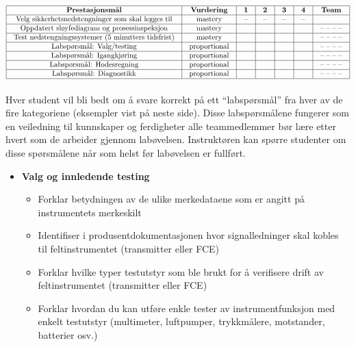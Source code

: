 $$\vbox{\offinterlineskip
\halign{\strut
\vrule \quad\hfil # \ \hfil & 
\vrule \quad\hfil # \ \hfil & 
\vrule \quad\hfil # \ \hfil & 
\vrule \quad\hfil # \ \hfil & 
\vrule \quad\hfil # \ \hfil & 
\vrule \quad\hfil # \ \hfil & 
\vrule \quad\hfil # \ \hfil \vrule \cr
\noalign{\hrule}
%
{\bf Prestasjonsmål} & {\bf Vurdering} & {\bf 1} & {\bf 2} & {\bf 3} & {\bf 4} & {\bf Team} \cr
%
\noalign{\hrule}
%
Velg sikkerhetsnedstengninger som skal legges til & mastery & -- & -- & -- & -- & \cr
%
\noalign{\hrule}
%
Oppdatert sløyfediagram og prosessinspeksjon & mastery & & & & & -- -- -- -- \cr
%
\noalign{\hrule}
%
Test nedstengningssystemer (5 minutters tidsfrist) & mastery & & & & & -- -- -- -- \cr
%
\noalign{\hrule}
%
Labspørsmål: Valg/testing & proportional &  &  &  &  & -- -- -- -- \cr
%
\noalign{\hrule}
%
Labspørsmål: Igangkjøring & proportional &  &  &  &  & -- -- -- -- \cr
%
\noalign{\hrule}
%
Labspørsmål: Hodesregning & proportional &  &  &  &  & -- -- -- -- \cr
%
\noalign{\hrule}
%
Labspørsmål: Diagnostikk & proportional &  &  &  &  & -- -- -- -- \cr
%
\noalign{\hrule}
} %
}$$ %

Hver student vil bli bedt om å svare korrekt på ett ``labspørsmål'' fra hver av de fire kategoriene (eksempler vist på neste side).  Disse labspørsmålene fungerer som en veiledning til kunnskaper og ferdigheter alle teammedlemmer bør lære etter hvert som de arbeider gjennom labøvelsen.  Instruktøren kan spørre studenter om disse spørsmålene når som helst før labøvelsen er fullført.

\vfil \eject

\noindent
{} 

\begin{itemize}
\item{} {\bf Valg og innledende testing}
\begin{itemize}

\item{} Forklar betydningen av de ulike merkedataene som er angitt på instrumentets merkeskilt
\item{} Identifiser i produsentdokumentasjonen hvor signalledninger skal kobles til feltinstrumentet (transmitter eller FCE)
\item{} Forklar hvilke typer testutstyr som ble brukt for å verifisere drift av feltinstrumentet (transmitter eller FCE)
\item{} Forklar hvordan du kan utføre enkle tester av instrumentfunksjon med enkelt testutstyr (multimeter, luftpumper, trykkmålere, motstander, batterier osv.)
\end{itemize}
\end{itemize}


